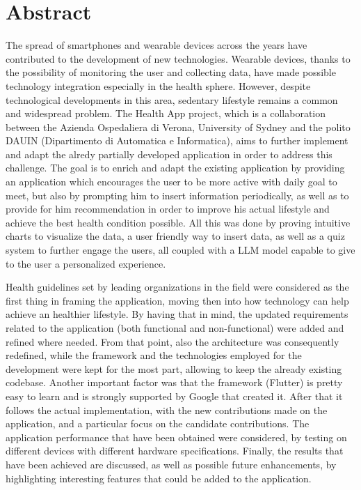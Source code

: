 \section{Abstract}

The spread of smartphones and wearable devices across the years have contributed to the development of new technologies. Wearable devices, thanks to the possibility of monitoring the user and collecting data, have made possible technology integration especially in the health sphere. However, despite technological developments in this area, sedentary lifestyle remains a common and widespread problem. The Health App project, which is a collaboration between the Azienda Ospedaliera di Verona, University of Sydney and the polito DAUIN (Dipartimento di Automatica e Informatica), aims to further implement and adapt the alredy partially developed application in order to address this challenge. The goal is to enrich and adapt the existing application by providing an application which encourages the user to be more active with daily goal to meet, but also by prompting him to insert information periodically, as well as to provide for him recommendation in order to improve his actual lifestyle and achieve the best health condition possible. All this was done by proving intuitive charts to visualize the data, a user friendly way to insert data, as well as a quiz system to further engage the users, all coupled with a LLM model capable to give to the user a personalized experience.

\noindent Health guidelines set by leading organizations in the field were considered as the first thing in framing the application, moving then into how technology can help achieve an healthier lifestyle. By having that in mind, the updated requirements related to the application (both functional and non-functional) were added and refined where needed. From that point, also the architecture was consequently redefined, while the framework and the technologies employed for the development were kept for the most part, allowing to keep the already existing codebase. Another important factor was that the framework (Flutter) is pretty easy to learn and is strongly supported by Google that created it. After that it follows the actual implementation, with the new contributions made on the application, and a particular focus on the candidate contributions. The application performance that have been obtained were considered, by testing on different devices with different hardware specifications. Finally, the results that have been achieved are discussed, as well as possible future enhancements, by highlighting interesting features that could be added to the application. 
